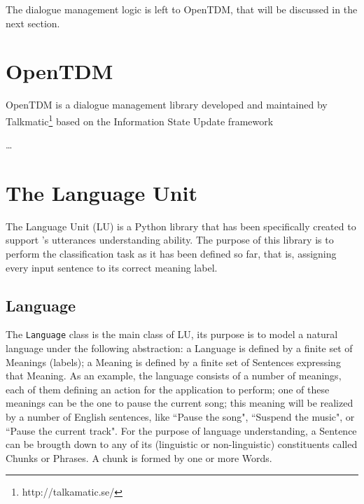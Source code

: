 The dialogue management logic is left to OpenTDM, that will be discussed in the next section.



\section{OpenTDM} \label{ch:arch:TDM}
OpenTDM is a dialogue management library developed and maintained by Talkmatic\footnote{http://talkamatic.se/} based on the Information State Update framework

\ldots

\section{The Language Unit} \label{ch:arch:LU}
The Language Unit (LU) is a Python library that has been specifically created to support \pname's utterances understanding ability. The purpose of this library is to perform the classification task as it has been defined so far, that is, assigning every input sentence to its correct meaning label.

\subsection{Language}
The \texttt{Language} class is the main class of LU, its purpose is to model a natural language under the following abstraction: a Language is defined by a finite set of Meanings (labels); a Meaning is defined by a finite set of Sentences expressing that Meaning. As an example, the \pname language consists of a number of meanings, each of them defining an action for the application to perform; one of these meanings can be the one to pause the current song; this meaning will be realized by a number of English sentences, like ``Pause the song", ``Suspend the music", or ``Pause the current track". For the purpose of language understanding, a Sentence can be brougth down to any of its (linguistic or non-linguistic) constituents called Chunks or Phrases. A chunk is formed by one or more Words.

